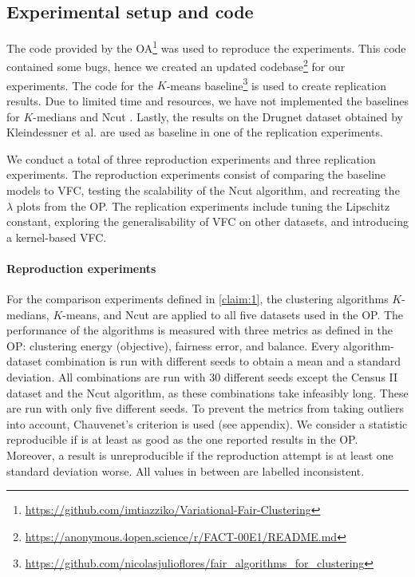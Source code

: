 \subsection{Experimental setup and code}
The code provided by the OA\footnote{\url{https://github.com/imtiazziko/Variational-Fair-Clustering}} was used to reproduce the experiments. This code contained some bugs, hence we created an updated codebase\footnote{\url{https://anonymous.4open.science/r/FACT-00E1/README.md}} for our experiments. The code for the $K$-means baseline\footnote{\label{bera_note}\url{https://github.com/nicolasjulioflores/fair_algorithms_for_clustering}} \citep{bera2019fair} is used to create replication results. Due to limited time and resources, we have not implemented the baselines for $K$-medians \citep{backurs2019scalable} and Ncut \citep{kleindessner2019guarantees}. Lastly, the results on the Drugnet dataset obtained by Kleindessner et al. are used as baseline in one of the replication experiments.


We conduct a total of three reproduction experiments and three replication experiments. The reproduction experiments consist of comparing the baseline models to VFC, testing the scalability of the Ncut algorithm, and recreating the $\lambda$ plots from the OP. The replication experiments include tuning the Lipschitz constant, exploring the generalisability of VFC on other datasets, and introducing a kernel-based VFC. 

\paragraph{Reproduction experiments}
For the comparison experiments defined in \ref{claim:1}, the clustering algorithms $K$-medians, $K$-means, and Ncut are applied to all five datasets used in the OP.
The performance of the algorithms is measured with three metrics as defined in the OP: clustering energy (objective), fairness error, and balance. Every algorithm-dataset combination is run with different seeds to obtain a mean and a standard deviation. All combinations are run with 30 different seeds except the Census II dataset and the Ncut algorithm, as these combinations take infeasibly long. These are run with only five different seeds. To prevent the metrics from taking outliers into account, Chauvenet's criterion \citep{lin2007cleaning} is used (see appendix).
We consider a statistic reproducible if is at least as good as the one reported results in the OP. Moreover, a result is unreproducible if the reproduction attempt is at least one standard deviation worse. All values in between are labelled inconsistent.

